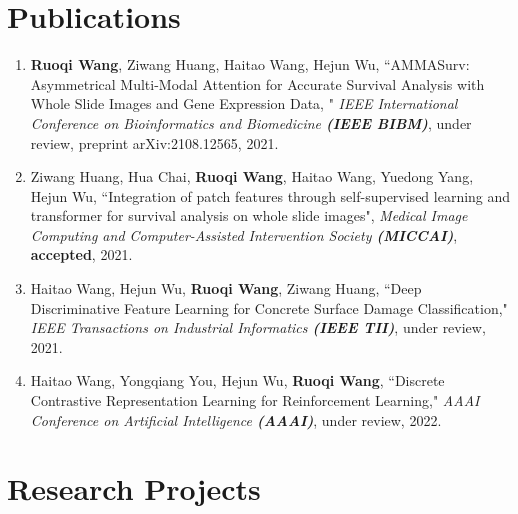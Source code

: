 \documentclass[a4,11pt]{article}
\begin{document}
\section{\large \textbf{Publications}} 
\begin{enumerate}[itemindent=0em]
\item \textbf{Ruoqi Wang}, Ziwang Huang, Haitao Wang, Hejun Wu, ``AMMASurv: Asymmetrical Multi-Modal Attention for Accurate Survival Analysis with Whole Slide Images and Gene Expression Data, " \textit{IEEE International Conference on Bioinformatics and Biomedicine \textbf{(IEEE BIBM)}}, under review, preprint arXiv:2108.12565, 2021.

\item Ziwang Huang, Hua Chai, \textbf{Ruoqi Wang}, Haitao Wang, Yuedong Yang, Hejun Wu, ``Integration of patch features through self-supervised learning and transformer for survival analysis on whole slide images",  \textit{Medical Image Computing and Computer-Assisted Intervention Society \textbf{(MICCAI)}}, \textbf{accepted}, 2021.

\item Haitao Wang, Hejun Wu, \textbf{Ruoqi Wang}, Ziwang Huang, ``Deep Discriminative Feature Learning for Concrete Surface Damage Classification," \textit{IEEE Transactions on Industrial Informatics \textbf{(IEEE TII)}}, under review, 2021.


\item Haitao Wang, Yongqiang You, Hejun Wu, \textbf{Ruoqi Wang}, ``Discrete Contrastive Representation Learning for Reinforcement Learning," \textit{AAAI Conference on Artificial Intelligence \textbf{(AAAI)}}, under review, 2022.
\end{enumerate}




\section{\large \textbf{Research Projects}} %

\end{document}
